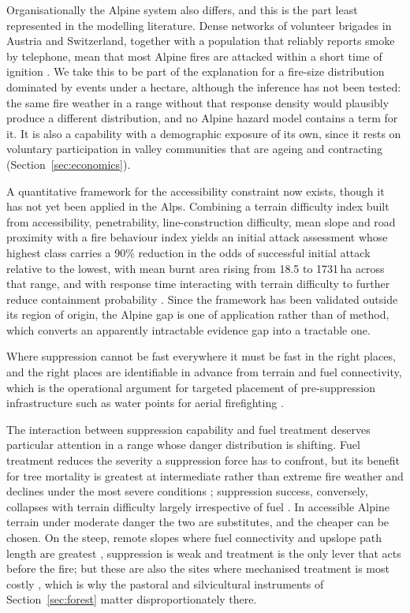 \documentclass[11pt,a4paper]{article}
\begin{document}
Organisationally the Alpine system also differs, and this is the part least represented in the modelling literature. Dense networks of volunteer brigades in Austria and Switzerland, together with a population that reliably reports smoke by telephone, mean that most Alpine fires are attacked within a short time of ignition \citep{muller_forest_2020}. We take this to be part of the explanation for a fire-size distribution dominated by events under a hectare, although the inference has not been tested: the same fire weather in a range without that response density would plausibly produce a different distribution, and no Alpine hazard model contains a term for it. It is also a capability with a demographic exposure of its own, since it rests on voluntary participation in valley communities that are ageing and contracting (Section~\ref{sec:economics}).

A quantitative framework for the accessibility constraint now exists, though it has not yet been applied in the Alps. Combining a terrain difficulty index built from accessibility, penetrability, line-construction difficulty, mean slope and road proximity with a fire behaviour index yields an initial attack assessment whose highest class carries a 90\% reduction in the odds of successful initial attack relative to the lowest, with mean burnt area rising from 18.5 to 1731\,ha across that range, and with response time interacting with terrain difficulty to further reduce containment probability \citep{cardil_assessing_2025}. Since the framework has been validated outside its region of origin, the Alpine gap is one of application rather than of method, which converts an apparently intractable evidence gap into a tractable one.

Where suppression cannot be fast everywhere it must be fast in the right places, and the right places are identifiable in advance from terrain and fuel connectivity, which is the operational argument for targeted placement of pre-suppression infrastructure such as water points for aerial firefighting \citep{conedera_linking_2024}.

The interaction between suppression capability and fuel treatment deserves particular attention in a range whose danger distribution is shifting. Fuel treatment reduces the severity a suppression force has to confront, but its benefit for tree mortality is greatest at intermediate rather than extreme fire weather and declines under the most severe conditions \citep{brodie_forest_2024}; suppression success, conversely, collapses with terrain difficulty largely irrespective of fuel \citep{cardil_assessing_2025}. In accessible Alpine terrain under moderate danger the two are substitutes, and the cheaper can be chosen. On the steep, remote slopes where fuel connectivity and upslope path length are greatest \citep{conedera_linking_2024}, suppression is weak and treatment is the only lever that acts before the fire; but these are also the sites where mechanised treatment is most costly \citep{dinca_timber_2025}, which is why the pastoral and silvicultural instruments of Section~\ref{sec:forest} matter disproportionately there.
\end{document}
